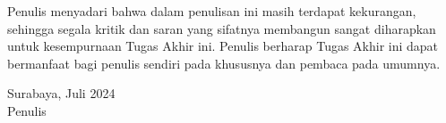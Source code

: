 Penulis menyadari bahwa dalam penulisan ini masih terdapat kekurangan, sehingga segala kritik dan saran yang sifatnya membangun sangat diharapkan untuk kesempurnaan Tugas Akhir ini. Penulis berharap  Tugas Akhir ini dapat bermanfaat bagi penulis sendiri pada khususnya dan pembaca pada umumnya.

\begin{flushright}
	Surabaya, Juli 2024\\
	\vspace{2cm}
	Penulis
\end{flushright}

